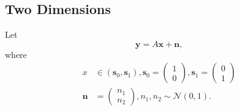 \documentclass{article}
\numberwithin{equation}{subsection}
\numberwithin{figure}{subsection}
\providecommand{\mbf}{\mathbf}
\providecommand{\brak}[1]{\ensuremath{\left(#1\right)}}
\providecommand{\gauss}[2]{\mathcal{N}\ensuremath{\left(#1,#2\right)}}
\begin{document}
\subsection{Two Dimensions}
Let 
\begin{equation}
\mbf{y} = A\mbf{x} + \mbf{n},
\end{equation}
where 
\begin{align}
x &\in \brak{\mbf{s}_0,\mbf{s}_1}, 
\mbf{s}_0 = 
\begin{pmatrix}
1 
\\
0
\end{pmatrix},
\mbf{s}_1 = 
\begin{pmatrix}
0 
\\
1
\end{pmatrix}
\\
\mbf{n} &= 
\begin{pmatrix}
n_1
\\
n_2
\end{pmatrix},
n_1,n_2 \sim \gauss{0}{1}.
\end{align}
\end{document}
